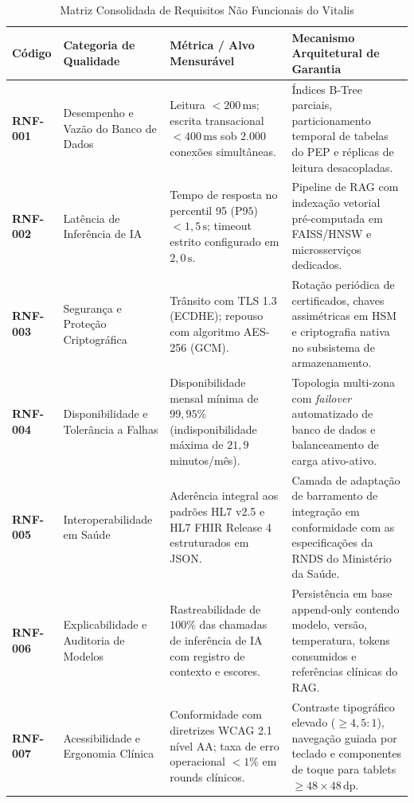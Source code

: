 \begin{table}[H]
\centering
\small
\caption{Matriz Consolidada de Requisitos Não Funcionais do Vitalis}
\label{tab:rnf_vitalis}
\begin{tabularx}{\textwidth}{l >{\raggedright\arraybackslash}p{3.5cm} >{\raggedright\arraybackslash}p{4.2cm} >{\raggedright\arraybackslash}X}
\toprule
\textbf{Código} & \textbf{Categoria de Qualidade} & \textbf{Métrica / Alvo Mensurável} & \textbf{Mecanismo Arquitetural de Garantia} \\
\midrule
\textbf{RNF-001} & Desempenho e Vazão do Banco de Dados & Leitura $< 200\,\text{ms}$; escrita transacional $< 400\,\text{ms}$ sob $2.000$ conexões simultâneas. & Índices B-Tree parciais, particionamento temporal de tabelas do PEP e réplicas de leitura desacopladas. \\
\addlinespace
\textbf{RNF-002} & Latência de Inferência de IA & Tempo de resposta no percentil 95 ($\text{P95}$) $< 1{,}5\,\text{s}$; timeout estrito configurado em $2{,}0\,\text{s}$. & Pipeline de RAG com indexação vetorial pré-computada em FAISS/HNSW e microsserviços dedicados. \\
\addlinespace
\textbf{RNF-003} & Segurança e Proteção Criptográfica & Trânsito com TLS 1.3 (ECDHE); repouso com algoritmo AES-256 (GCM). & Rotação periódica de certificados, chaves assimétricas em HSM e criptografia nativa no subsistema de armazenamento. \\
\addlinespace
\textbf{RNF-004} & Disponibilidade e Tolerância a Falhas & Disponibilidade mensal mínima de $99{,}95\%$ (indisponibilidade máxima de $21{,}9$ minutos/mês). & Topologia multi-zona com \textit{failover} automatizado de banco de dados e balanceamento de carga ativo-ativo. \\
\addlinespace
\textbf{RNF-005} & Interoperabilidade em Saúde & Aderência integral aos padrões HL7 v2.5 e HL7 FHIR Release 4 estruturados em JSON. & Camada de adaptação de barramento de integração em conformidade com as especificações da RNDS do Ministério da Saúde. \\
\addlinespace
\textbf{RNF-006} & Explicabilidade e Auditoria de Modelos & Rastreabilidade de $100\%$ das chamadas de inferência de IA com registro de contexto e escores. & Persistência em base append-only contendo modelo, versão, temperatura, tokens consumidos e referências clínicas do RAG. \\
\addlinespace
\textbf{RNF-007} & Acessibilidade e Ergonomia Clínica & Conformidade com diretrizes WCAG 2.1 nível AA; taxa de erro operacional $< 1\%$ em rounds clínicos. & Contraste tipográfico elevado ($\ge 4{,}5:1$), navegação guiada por teclado e componentes de toque para tablets $\ge 48 \times 48\,\text{dp}$. \\
\bottomrule
\end{tabularx}
\end{table}

